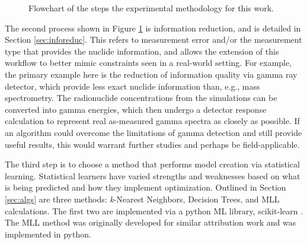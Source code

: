 \begin{figure}[!hbt]
  \caption{Flowchart of the steps the experimental methodology for this work.}
  \label{fig:intromethod}
\end{figure}

The second process shown in Figure \ref{fig:intromethod} is information
reduction, and is detailed in Section \ref{sec:inforeduc}.  This refers to
measurement error and/or the measurement type that provides the nuclide
information, and allows the extension of this workflow to better mimic
constraints seen in a real-world setting.  For example, the primary example
here is the reduction of information quality via gamma ray detector, which
provide less exact nuclide information than, e.g., mass spectrometry.  The
radionuclide concentrations from the simulations can be converted into gamma
energies, which then undergo a detector response calculation to represent real
as-measured gamma spectra as closely as possible.  If an algorithm could
overcome the limitations of gamma detection and still provide useful results,
this would warrant further studies and perhaps be field-applicable.

The third step is to choose a method that performs model creation via
statistical learning.  Statistical learners have varied strengths and
weaknesses based on what is being predicted and how they implement
optimization. Outlined in Section \ref{sec:algs} are three methods:
\textit{k}-Nearest Neighbors, Decision Trees, and \gls{MLL} calculations. The
first two are implemented via a python \gls{ML} library, scikit-learn
\cite{scikit}. The \gls{MLL} method was originally developed for similar
attribution work \cite{mll_method, mll_sensitivity, mll_validate} and was
implemented in python.

